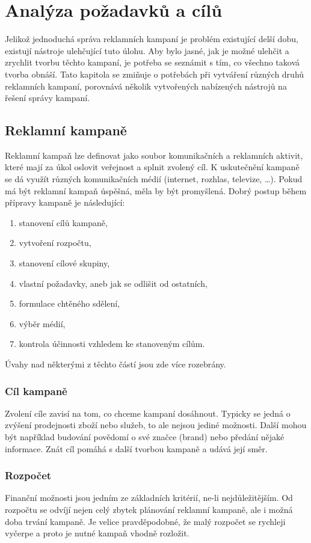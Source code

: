 \chapter{Analýza požadavků a cílů}
\label{chap:analysis}
Jelikož jednoduchá správa reklamních kampaní je problém existující delší dobu, existují nástroje ulehčující tuto úlohu. Aby bylo jasné, jak
je možné ulehčit a zrychlit tvorbu těchto kampaní, je potřeba se seznámit s tím, co všechno taková tvorba obnáší.
Tato kapitola se zmiňuje o potřebách při vytváření různých druhů reklamních kampaní, porovnává několik vytvořených nabízených
nástrojů na řešení správy kampaní.

\section{Reklamní kampaně}
Reklamní kampaň lze definovat jako soubor komunikačních a reklamních aktivit, které mají za úkol oslovit veřejnost a splnit zvolený cíl. K uskutečnění kampaně se dá využít různých komunikačních
médií (internet, rozhlas, televize, \ldots). Pokud má být reklamní kampaň úspěšná, měla by být promyšlená.
Dobrý postup během přípravy kampaně je následující:
\begin{enumerate}
    \item stanovení cílů kampaně,
    \item vytvoření rozpočtu,
    \item stanovení cílové skupiny,
    \item vlastní požadavky, aneb jak se odlišit od ostatních,
    \item formulace chtěného sdělení,
    \item výběr médií,
    \item kontrola účinnosti vzhledem ke stanoveným cílům.
\end{enumerate}
\cite{vysekalova:reklama}
Úvahy nad některými z těchto částí jsou zde více rozebrány.


\subsection{Cíl kampaně}
Zvolení cíle zavisí na tom, co chceme kampaní dosáhnout. Typicky se jedná o zvýšení prodejnosti zboží nebo služeb, to ale nejsou jediné možnosti. Další mohou být například budování
povědomí o své značce (brand) nebo předání nějaké informace. Znát cíl pomáhá s další tvorbou kampaně a udává její směr.

\subsection{Rozpočet}
Finanční možnosti jsou jedním ze základních kritérií, ne-li nejdůležitějším. Od rozpočtu se odvíjí nejen celý zbytek plánování reklamní kampaně, ale i možná
doba trvání kampaně. Je velice pravděpodobné, že malý rozpočet se rychleji vyčerpe a proto je nutné kampaň vhodně rozložit.

